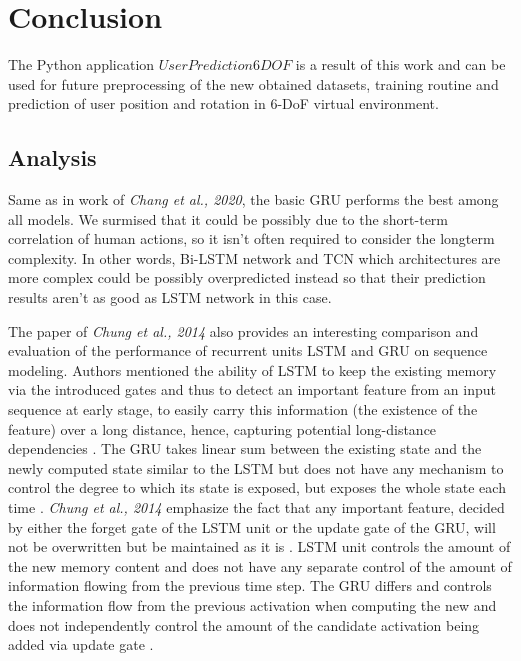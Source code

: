 \chapter{Conclusion}
\label{sec:conclusion}
The Python application $UserPrediction6DOF$ is a result of this work and can be used for future preprocessing of the new obtained datasets, training routine and prediction of user position and rotation in 6-DoF virtual environment. 

\section{Analysis}
\label{sec:conclusion:analysis}
Same as in work of \textit{Chang et al., 2020}, the basic GRU performs the best among all models. We surmised that it could be possibly due to the short-term correlation of human actions, so it isn’t often required to consider the longterm complexity. In other words, Bi-LSTM network and TCN which architectures are more complex could be possibly overpredicted instead so that their prediction results aren’t as good as LSTM network in this case.

The paper of \textit{Chung et al., 2014}  also provides an interesting comparison and evaluation of the performance of recurrent units LSTM and GRU on sequence modeling. Authors mentioned the ability of LSTM to keep the existing memory via the introduced gates and thus to detect an important feature from an input sequence at early stage, to easily carry this information (the existence of the feature) over a long distance, hence, capturing potential long-distance dependencies \cite{empirical_evaluation}. The GRU takes linear sum between the existing state and the newly computed state similar to the LSTM but does not have any mechanism to control the degree to which its state is exposed, but exposes the whole state each time \cite{empirical_evaluation}. \textit{Chung et al., 2014} emphasize the fact that any important feature, decided by either the forget gate of the LSTM unit or the update gate of the GRU, will not be overwritten but be maintained as it is \cite{empirical_evaluation}. LSTM unit controls the amount of the new memory content and does not have any separate control of the amount of information flowing from the previous time step. The GRU differs and controls the information flow from the previous activation when computing the new and does not independently control the amount of the candidate activation being added via update gate \cite{empirical_evaluation}.


